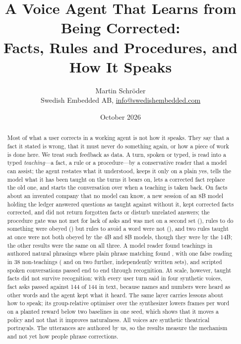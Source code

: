 \documentclass[11pt,a4paper]{article}
\title{A Voice Agent That Learns from Being Corrected:\\
Facts, Rules and Procedures, and How It Speaks}
\author{Martin Schröder\\
Swedish Embedded AB, \href{mailto:info@swedishembedded.com}{info@swedishembedded.com}}
\date{October 2026}
\begin{document}
\maketitle

\begin{abstract}
Most of what a user corrects in a working agent is not how it speaks. They say that a fact it stated is wrong, that it must never do something again, or how a piece of work is done here. We
treat such feedback as data. A turn, spoken or typed, is read into a typed \emph{teaching}---a fact, a rule or a procedure---by a conservative reader that a model can assist; the agent restates what it understood,
keeps it only on a plain yes, tells the model what it has been taught on the turns it bears on, lets a corrected fact replace the old one, and starts the conversation over when a teaching is taken back. On facts about an invented company that no
model can know, a new session of an 8B model holding the ledger answered \TeachFactTaught{} questions as taught against \TeachFactUntaught{} without it, kept corrected facts corrected, and did not return forgotten facts or disturb unrelated answers; the procedure gate was not met for lack of asks and was met on a second set (\MoreProcedures{}), rules to do something were obeyed (\MoreDoRules{}) but rules to avoid a word were not (\MoreAvoidRules{}), and two rules taught at once were not both obeyed by the 4B and 8B models, though they were by the 14B; the other results were the same on all three. A model reader found \ReadModelFound{} teachings in authored natural phrasings where plain phrase matching found \ReadPlainFound{}, with one false reading in 38 non-teachings (\ReadBModelFired{} and \ReadCModelFired{} on two further, independently written sets), and
\SpokenPassed{} scripted spoken conversations passed end to end through recognition. At scale, however, taught facts did not survive recognition: with every user turn said in four synthetic voices, \SpokenFactPass{} fact asks passed against 144 of 144 in text, because names and numbers were heard as other words and the agent kept what it heard. The same layer carries lessons about how to speak; its group-relative optimiser over the synthesizer lowers frames per word on a planted reward below two baselines in one seed, which shows that it moves a policy and not that it improves naturalness. All voices are synthetic theatrical portrayals. The utterances are authored by us, so the results measure the mechanism and not yet how people phrase corrections.
\end{abstract}












\end{document}

